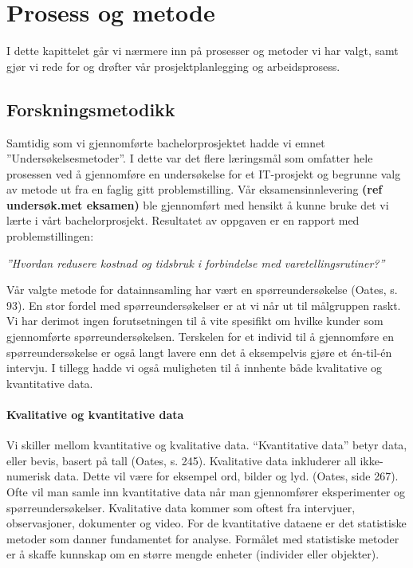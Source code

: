 \chapter{\color{Millum}\textbf{Prosess og metode}}
\newthought I dette kapittelet går vi nærmere inn på prosesser og metoder vi har valgt, samt gjør vi rede for og drøfter vår prosjektplanlegging og arbeidsprosess.

\section{\textbf{Forskningsmetodikk}}

Samtidig som vi gjennomførte bachelorprosjektet hadde vi emnet ''Undersøkelsesmetoder''. I dette var det flere læringsmål som omfatter hele prosessen ved å gjennomføre en undersøkelse for et IT-prosjekt og begrunne valg av metode ut fra en faglig gitt problemstilling. Vår eksamensinnlevering \textbf{(ref undersøk.met eksamen)} ble gjennomført med hensikt å kunne bruke det vi lærte i vårt bachelorprosjekt. Resultatet av oppgaven er en rapport med problemstillingen:

\textit{''Hvordan redusere kostnad og tidsbruk i forbindelse med varetellingsrutiner?''}


Vår valgte metode for datainnsamling har vært en spørreundersøkelse \cite{oates2006researching} (Oates, s. 93). En stor fordel med spørreundersøkelser er at vi når ut til målgruppen raskt. Vi har derimot ingen forutsetningen til å vite spesifikt om hvilke kunder som gjennomførte spørreundersøkelsen. Terskelen for et individ til å gjennomføre en spørreundersøkelse er også langt lavere enn det å eksempelvis gjøre et én-til-én intervju. I tillegg hadde vi også muligheten til å innhente både kvalitative og kvantitative data.

\subsubsection{\textbf{Kvalitative og kvantitative data}}

Vi skiller mellom kvantitative og kvalitative data. “Kvantitative data” betyr data, eller bevis, basert på tall (Oates, s. 245). Kvalitative data inkluderer all ikke-numerisk data. Dette vil være for eksempel ord, bilder og lyd. (Oates, side 267). Ofte vil man samle inn kvantitative data når man gjennomfører eksperimenter og spørreundersøkelser. Kvalitative data kommer som oftest fra intervjuer, observasjoner, dokumenter og video.
For de kvantitative dataene er det statistiske metoder som danner fundamentet for analyse. Formålet med statistiske metoder er å skaffe kunnskap om en større mengde enheter (individer eller objekter).

